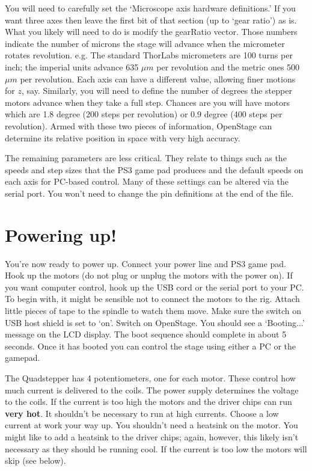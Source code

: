 \documentclass[11pt]{report} %
\begin{document}
You will need to carefully set the `Microscope axis hardware definitions.' If you want three axes then leave the first bit of that section (up to `gear ratio') as is. What you likely will need to do is modify the gearRatio vector. Those numbers indicate the number of microns the stage will advance when the micrometer rotates revolution. e.g. The standard ThorLabs micrometers are 100 turns per inch; the imperial units advance 635 $\mu m$ per revolution and the metric ones 500 $\mu m$ per revolution. Each axis can have a different value, allowing finer motions for $z$, say. Similarly, you will need to define the number of degrees the stepper motors advance when they take a full step. Chances are you will have motors which are 1.8 degree (200 steps per revolution) or 0.9 degree (400 steps per revolution). Armed with these two pieces of information, OpenStage can determine its relative position in space with very high accuracy. 

The remaining parameters are less critical. They relate to things such as the speeds and step sizes that the PS3 game pad produces and the default speeds on each axis for PC-based control. Many of these settings can be altered via the serial port. You won't need to change the pin definitions at the end of the file. 

\section{Powering up!}
You're now ready to power up. Connect your power line and PS3 game pad. Hook up the motors (do not plug or unplug the motors with the power on). If you want computer control, hook up the USB cord or the serial port to your PC. To begin with, it might be sensible not to connect the motors to the rig. Attach little pieces of tape to the spindle to watch them move. Make sure the switch on USB host shield is set to `on'. Switch on OpenStage. You should see a `Booting...' message on the LCD display. The boot sequence should complete in about 5 seconds. Once it has booted you can control the stage using either a PC or the gamepad. 

The Quadstepper has 4 potentiometers, one for each motor. These control how much current is delivered to the coils. The power supply determines the voltage to the coils. If the current is too high the motors and the driver chips can run \textbf{very hot}. It shouldn't be necessary to run at high currents. Choose a low current at work your way up. You shouldn't need a heatsink on the motor. You might like to add a heatsink to the driver chips; again, however, this likely isn't necessary as they should be running cool. If the current is too low the motors will skip (see below).
\end{document}
